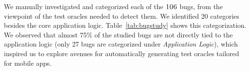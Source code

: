 
We manually investigated and categorized each of the $\textsc{106}$ bugs, from the viewpoint of the test oracles needed to detect them. We identified 20 categories besides the core application logic. Table~\ref{tab:bugstudy} shows this categorization. %
We observed that almost 75\% of the studied bugs are not directly tied to the application logic (only 27 bugs are categorized under \emph{Application Logic}), which inspired us to explore avenues for automatically generating test oracles tailored for mobile apps.

